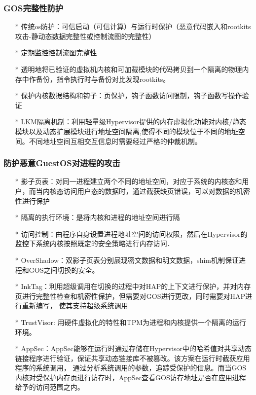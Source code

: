 \documentclass[UTF8]{ctexart}
\begin{document}
		\subsubsection{GOS完整性防护} 
	\begin{itemize}
	\item[*] 传统os防护：可信启动（可信计算）与运行时保护（恶意代码嵌入和rootkits攻击-静动态数据完整性或控制流图的完整性）
	\item[*] 定期监控控制流图完整性
	\item[*] 透明地将已验证的虚拟机内核和可加载模块的代码拷贝到一个隔离的物理内存中作备份，指令执行时与备份对比发现rootkits。
	\item[*] 保护内核数据结构和钩子：页保护，钩子函数访问限制，钩子函数写操作验证
	\item[*] LKM隔离机制：利用轻量级Hypervisor提供的内存虚拟化功能对内核/静态模块以及动态扩展模块进行地址空间隔离,使得不同的模块位于不同的地址空间。不同地址空间互相交互信息时需要经过严格的仲裁机制。
	\end{itemize}
	\subsubsection{防护恶意GuestOS对进程的攻击} 
	\begin{itemize}
	\item[*] 影子页表：对同一进程建立两个不同的地址空间，对应于系统的内核态和用户，而当内核态访问用户态的数据时，通过截获缺页错误，可以对数据的机密性进行保护
	\item[*] 隔离的执行环境：是将内核和进程的地址空间进行隔
	\item[*] 访问控制：由程序自身设置进程地址空间的访问权限，然后在Hypervisor的监控下系统内核按照既定的安全策略进行内存访问．

	\item[*] OverShadow：双影子页表分别展现密文数据和明文数据，shim机制保证进程和GOS之间切换的安全。
	\item[*] InkTag：利用超级调用在切换的过程中对HAP的上下文进行保护，并对内存页进行完整性检查和机密性保护，但需要对GOS进行更改，同时需要对HAP进行重新编写， 使其支持超级系统调用
	\item[*] TrustVisor: 用硬件虚拟化的特性和TPM为进程和内核提供一个隔离的运行环境。
	\item[*] AppSec：AppSec能够在运行时通过存储在Hypervisor中的哈希值对共享动态链接程序进行验证，保证共享动态链接库不被篡改。该方案在运行时截获应用程序的系统调用， 通过分析系统调用的参数，追踪受保护的信息。而当GOS内核对受保护内存页进行访存时，AppSec查看GOS访存地址是否在应用进程给予的访问范围之内。
	\end{itemize}
\end{document}
